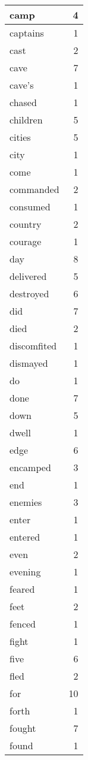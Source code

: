 \begin{center}
\begin{longtable}{l|r}
camp & 4 \\ \hline
captains & 1 \\ \hline
cast & 2 \\ \hline
cave & 7 \\ \hline
cave's & 1 \\ \hline
chased & 1 \\ \hline
children & 5 \\ \hline
cities & 5 \\ \hline
city & 1 \\ \hline
come & 1 \\ \hline
commanded & 2 \\ \hline
consumed & 1 \\ \hline
country & 2 \\ \hline
courage & 1 \\ \hline
day & 8 \\ \hline
delivered & 5 \\ \hline
destroyed & 6 \\ \hline
did & 7 \\ \hline
died & 2 \\ \hline
discomfited & 1 \\ \hline
dismayed & 1 \\ \hline
do & 1 \\ \hline
done & 7 \\ \hline
down & 5 \\ \hline
dwell & 1 \\ \hline
edge & 6 \\ \hline
encamped & 3 \\ \hline
end & 1 \\ \hline
enemies & 3 \\ \hline
enter & 1 \\ \hline
entered & 1 \\ \hline
even & 2 \\ \hline
evening & 1 \\ \hline
feared & 1 \\ \hline
feet & 2 \\ \hline
fenced & 1 \\ \hline
fight & 1 \\ \hline
five & 6 \\ \hline
fled & 2 \\ \hline
for & 10 \\ \hline
forth & 1 \\ \hline
fought & 7 \\ \hline
found & 1 \\ \hline

\end{longtable}
\end{center}
